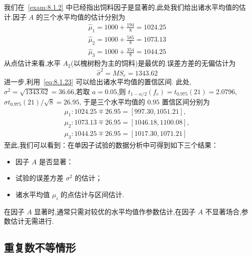 \begin{example}
我们在~\ref{exam:8.1.2} 中已经指出饲料因子是显著的,此处我们给出诸水平均值的估计.因子 $A$ 的三个水平均值的估计分别为
  \begin{gather*} \hat{\mu}_{1} =1000+\frac{194}{8}=1024.25 \\
    \hat{\mu}_{2} =1000+\frac{585}{8}=1073.13 \\
    \hat{\mu}_{3} =1000+\frac{354}{8}=1044.25
  \end{gather*}
从点估计来看,水平 $A_2$(以槐树粉为主的饲料)是最优的.误差方差的无偏估计为
\begin{equation*}
  \hat{\sigma}^{2}=M S_{e}=1343.62
\end{equation*}
进一步,利用~\ref{eq:8.1.23} 可以给出诸水平均值的置信区间. 此处,$\sigma^2=\sqrt{1343.62}=
36.66$,若取 $a=0.05$,则 $t_{1-\alpha/2} (f_e)=t_{0.975}(21)=2.0796$, $\hat{\sigma} t_{0.975}(21)/\sqrt{8}=26.95$, 于是三个水平均值的 $0.95$ 置信区间分别为
\begin{gather*}
  \mu_{1} : 1024.25 \mp 26.95 = [997.30, 1051.21],\\
  \mu_{2} : 1073.13 \mp 26.95=[1046.18,1100.08],\\
  \mu_{3} : 1044.25 \mp 26.95=[1017.30,1071.21]
\end{gather*}
至此,我们可以看到：在单因子试验的数据分析中可得到如下三个结果：
\begin{itemize}
  \item 因子 $A$ 是否显著：
  \item 试验的误差方差 $\sigma^2$ 的估计；
  \item 诸水平均值 $\mu_i$ 的点估计与区间估计.
\end{itemize}

在因子 $A$ 显著时,通常只需对较优的水平均值作参数估计,在因子 $A$ 不显著场合,参数估计无需进行.
\end{example}
\subsection{重复数不等情形}

